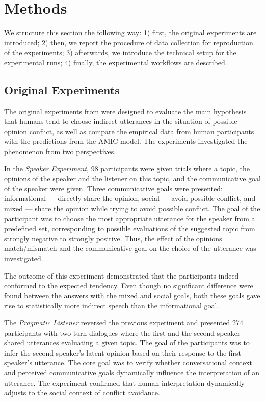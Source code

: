 \documentclass[11pt]{article}
\begin{document}
\section{Methods}
\label{sec:methods}

We structure this section the following way: 1) first, the original experiments are introduced; 2) then, we report the procedure of data collection for reproduction of the experiments; 3) afterwards, we introduce the technical setup for the experimental runs; 4) finally, the experimental workflows are described.

\subsection{Original Experiments}
\label{sec:orig}

The original experiments from \citet{achimova-2025} were designed to evaluate the main hypothesis that humans tend to choose indirect utterances in the situation of possible opinion conflict, as well as compare the empirical data from human participants with the predictions from the AMIC model. The experiments investigated the phenomenon from two perspectives.

In the \textit{Speaker Experiment}, 98 participants were given trials where a topic, the opinions of the speaker and the listener on this topic, and the communicative goal of the speaker were given. Three communicative goals were presented: informational --- directly share the opinion, social --- avoid possible conflict, and mixed --- share the opinion while trying to avoid possible conflict. The goal of the participant was to choose the most appropriate utterance for the speaker from a predefined set, corresponding to possible evaluations of the suggested topic from strongly negative to strongly positive. Thus, the effect of the opinions match/mismatch and the communicative goal on the choice of the utterance was investigated.

The outcome of this experiment demonstrated that the participants indeed conformed to the expected tendency. Even though no significant difference were found between the answers with the mixed and social goals, both these goals gave rise to statistically more indirect speech than the informational goal.

The \textit{Pragmatic Listener} reversed the previous experiment and presented 274 participants with two-turn dialogues where the first and the second speaker shared utterances evaluating a given topic. The goal of the participants was to infer the second speaker's latent opinion based on their response to the first speaker's utterance. The core goal was to verify whether conversational context and perceived communicative goals dynamically influence the interpretation of an utterance. The experiment confirmed that human interpretation dynamically adjusts to the social context of conflict avoidance. 
\end{document}
